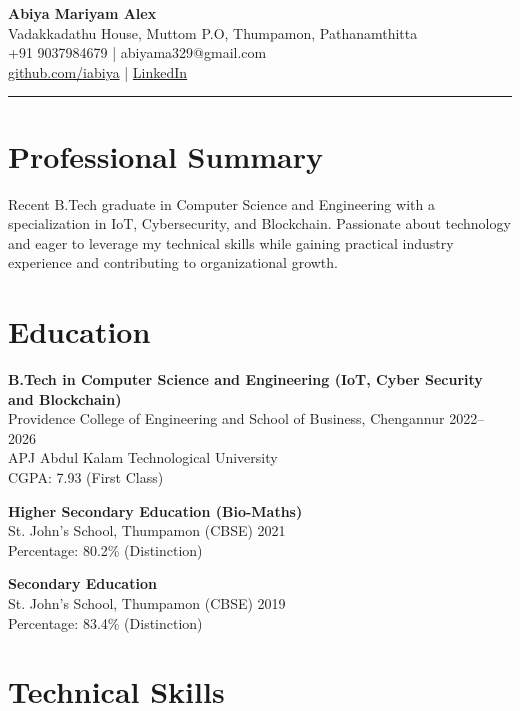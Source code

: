 \documentclass[a4paper,10pt]{article}
\begin{document}
\begin{center}
{\Large \textbf{Abiya Mariyam Alex}}\\
Vadakkadathu House, Muttom P.O, Thumpamon, Pathanamthitta\\
+91 9037984679 \;|\; abiyama329@gmail.com\\
\href{https://github.com/iabiya}{github.com/iabiya} \;|\;
\href{https://linkedin.com/in/abiya-mariyam-alex-229b2b29a}{LinkedIn}
\end{center}

\hrule
\vspace{0.1cm}

\section*{Professional Summary}
Recent B.Tech graduate in Computer Science and
Engineering with a specialization in IoT, Cybersecurity, and
Blockchain. Passionate about technology and eager to
leverage my technical skills while gaining practical
industry experience and contributing to organizational
growth.

\section*{Education}

\textbf{B.Tech in Computer Science and Engineering (IoT, Cyber Security and Blockchain)}\\
Providence College of Engineering and School of Business, Chengannur \hfill 2022--2026\\
APJ Abdul Kalam Technological University\\ 
CGPA: 7.93 (First Class)\

\vspace{0.05cm}

\textbf{Higher Secondary Education (Bio-Maths)}\\
St. John's School, Thumpamon (CBSE) \hfill 2021\\
Percentage: 80.2\% (Distinction)

\vspace{0.05cm}

\textbf{Secondary Education}\\
St. John's School, Thumpamon (CBSE) \hfill 2019\\
Percentage: 83.4\% (Distinction)

\section*{Technical Skills}
\end{document}
